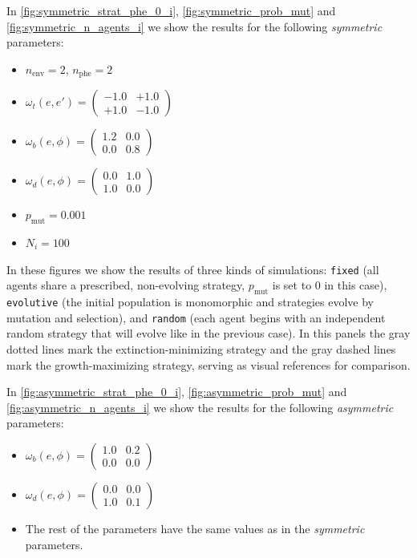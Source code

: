 \documentclass[a4paper,10pt,twocolumn]{article}
\begin{document}
In \autoref{fig:symmetric_strat_phe_0_i}, \autoref{fig:symmetric_prob_mut} and \autoref{fig:symmetric_n_agents_i} we show the results for the following \emph{symmetric} parameters:
\begin{itemize}
    \item $n_{\text{env}}=2$, $n_{\text{phe}}=2$
    \item $\omega_t(e,e')=\begin{pmatrix}-1.0&+1.0\\+1.0&-1.0\end{pmatrix}$
    \item $\omega_b(e,\phi)=\begin{pmatrix}1.2&0.0\\0.0&0.8\end{pmatrix}$
    \item $\omega_d(e,\phi)=\begin{pmatrix}0.0&1.0\\1.0&0.0\end{pmatrix}$
    \item $p_{\text{mut}}=0.001$
    \item $N_i=100$
\end{itemize}

In these figures we show the results of three kinds of simulations: \texttt{fixed} (all agents share a prescribed, non-evolving strategy, $p_{\text{mut}}$ is set to $0$ in this case), \texttt{evolutive} (the initial population is monomorphic and strategies evolve by mutation and selection), and \texttt{random} (each agent begins with an independent random strategy that will evolve like in the previous case). In this panels the gray dotted lines mark the extinction-minimizing strategy and the gray dashed lines mark the growth-maximizing strategy, serving as visual references for comparison.

In \autoref{fig:asymmetric_strat_phe_0_i}, \autoref{fig:asymmetric_prob_mut} and \autoref{fig:asymmetric_n_agents_i} we show the results for the following \emph{asymmetric} parameters:
\begin{itemize}
    \item $\omega_b(e,\phi)=\begin{pmatrix}1.0&0.2\\0.0&0.0\end{pmatrix}$
    \item $\omega_d(e,\phi)=\begin{pmatrix}0.0&0.0\\1.0&0.1\end{pmatrix}$
    \item The rest of the parameters have the same values as in the \emph{symmetric} parameters.
\end{itemize}
\end{document}
